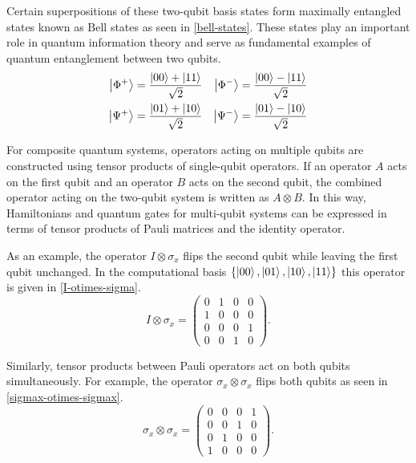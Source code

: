 Certain superpositions of these two-qubit basis states form maximally entangled states known as Bell states as seen in \cref{bell-states}. These states play an important role in quantum information theory and serve as fundamental examples of quantum entanglement between two qubits. 
\begin{equation}\label{bell-states}
\begin{aligned}
\left| \Phi^+ \right\rangle &= \frac{\left| 00 \right\rangle + \left| 11 \right\rangle}{\sqrt{2}} &
\left| \Phi^- \right\rangle &= \frac{\left| 00 \right\rangle - \left| 11 \right\rangle}{\sqrt{2}} \\
\left| \Psi^+ \right\rangle &= \frac{\left| 01 \right\rangle + \left| 10 \right\rangle}{\sqrt{2}} &
\left| \Psi^- \right\rangle &= \frac{\left| 01 \right\rangle - \left| 10 \right\rangle}{\sqrt{2}}
\end{aligned}
\end{equation}

For composite quantum systems, operators acting on multiple qubits are constructed using tensor products of single-qubit operators. If an operator $A$ acts on the first qubit and an operator $B$ acts on the second qubit, the combined operator acting on the two-qubit system is written as $A \otimes B$. In this way, Hamiltonians and quantum gates for multi-qubit systems can be expressed in terms of tensor products of Pauli matrices and the identity operator.

As an example, the operator $I \otimes \sigma_x$ flips the second qubit while leaving the first qubit unchanged. In the computational basis $\{\left| 00 \right\rangle,\left| 01 \right\rangle,\left| 10 \right\rangle,\left| 11 \right\rangle\}$ this operator is given in \cref{I-otimes-sigma}.
\begin{equation}\label{I-otimes-sigma}
I \otimes \sigma_x =
\begin{pmatrix}
0 & 1 & 0 & 0 \\
1 & 0 & 0 & 0 \\
0 & 0 & 0 & 1 \\
0 & 0 & 1 & 0
\end{pmatrix}.
\end{equation}

Similarly, tensor products between Pauli operators act on both qubits simultaneously. For example, the operator $\sigma_x \otimes \sigma_x$ flips both qubits as seen in \cref{sigmax-otimes-sigmax}.
\begin{equation}\label{sigmax-otimes-sigmax}
\sigma_x \otimes \sigma_x =
\begin{pmatrix}
0 & 0 & 0 & 1 \\
0 & 0 & 1 & 0 \\
0 & 1 & 0 & 0 \\
1 & 0 & 0 & 0
\end{pmatrix}.
\end{equation}

